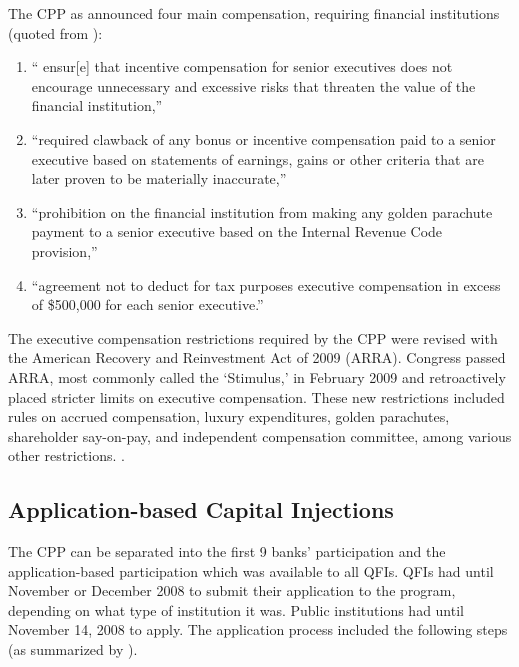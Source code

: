 \documentclass[12pt]{article}
\begin{document}
The CPP as announced four main compensation, requiring financial institutions (quoted from \citet{CPPAnnouncement}):
\begin{enumerate}
\item `` ensur[e] that incentive compensation for senior executives does not encourage unnecessary and excessive risks that threaten the value of the financial institution,''
\item ``required clawback of any bonus or incentive compensation paid to a senior executive based on statements of earnings, gains or other criteria that are later proven to be materially inaccurate,''
\item ``prohibition on the financial institution from making any golden parachute payment to a senior executive based on the Internal Revenue Code provision,''
\item ``agreement not to deduct for tax purposes executive compensation in excess of \$500,000 for each senior executive.''
\end{enumerate}

The executive compensation restrictions required by the CPP were revised with the American Recovery and Reinvestment Act of 2009 (ARRA). Congress passed ARRA, most commonly called the `Stimulus,' in February 2009 and retroactively placed stricter limits on executive compensation. These new restrictions included rules on accrued compensation, luxury expenditures, golden parachutes, shareholder say-on-pay, and independent compensation committee, among various other restrictions. \citep{mofoComp}.

\subsection*{Application-based Capital Injections}

The CPP can be separated into the first 9 banks' participation and the application-based participation which was available to all QFIs. QFIs had until November or December 2008 to submit their application to the program, depending on what type of institution it was. Public institutions had until November 14, 2008 to apply. The application process included the following steps (as summarized by \citet{mofo}). 
\end{document}
